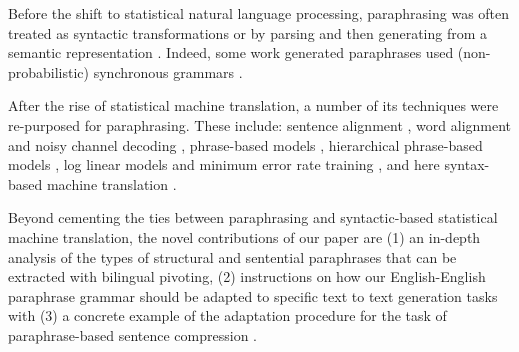 \documentclass[11pt]{article}
\begin{document}
Before the shift to statistical natural language processing, paraphrasing was often treated as syntactic transformations or by parsing and then generating from a semantic representation \cite{mckeown:1979:ACL,Muraki1982,Meteer1988,Shemtov1996,Yamamoto2002}.  Indeed, some work generated paraphrases used (non-probabilistic) synchronous grammars \cite{Shieber1990,Dras1997,Dras1999,Kozlowski2003}.

After the rise of statistical machine translation, a number of its techniques were re-purposed for paraphrasing.  These include: sentence alignment \cite{Gale1993,Barzilay2003a}, word alignment and noisy channel decoding \cite{Brown1990,Quirk2004}, phrase-based models \cite{Koehn2003,Callison-Burch2005}, hierarchical phrase-based models \cite{Chiang2005,Madnani2007}, log linear models and minimum error rate training \cite{Och2003c,Madnani2007,Zhao2008b}, and here syntax-based machine translation \cite{Wu1997,Yamada2001,Melamed2004,Quirk2005}.


Beyond cementing the ties between paraphrasing and syntactic-based statistical machine translation, the novel contributions of our paper are (1) an in-depth analysis of the types of structural and sentential paraphrases that can be extracted with bilingual pivoting, (2) instructions on how our English-English paraphrase grammar should be adapted to specific text to text generation tasks \cite{zhao-EtAl:2009:ACLIJCNLP2} with (3) a concrete example of the adaptation procedure for the task of paraphrase-based sentence compression \cite{KnightMarcuAI02,cohn-lapata:2008,Cohn2009}.





\end{document}
